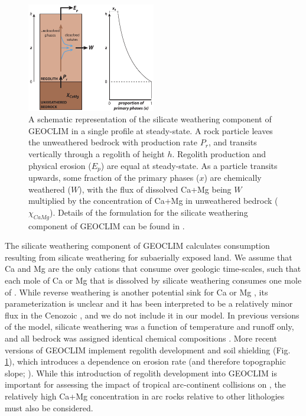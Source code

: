 \begin{figure}[h!]
\begin{center}
	\includegraphics[width=0.5\textwidth]{figures/SEAIs/regolith-schematic.pdf}
	\caption[Schematic representation of the silicate weathering component of GEOCLIM.]{A schematic representation of the silicate weathering component of GEOCLIM in a single profile at steady-state. A rock particle leaves the unweathered bedrock with production rate $P_{r}$, and transits vertically through a regolith of height $h$. Regolith production and physical erosion ($E_{p}$) are equal at steady-state. As a particle transits upwards, some fraction of the primary phases ($x$) are chemically weathered ($W$), with the flux of dissolved Ca+Mg being $W$ multiplied by the concentration of Ca+Mg in unweathered bedrock ($\chi_{CaMg}$). Details of the formulation for the silicate weathering component of GEOCLIM can be found in \MM.}
	\label{fig:regolith-schematic}
\end{center}
\end{figure}

The silicate weathering component of GEOCLIM calculates \COtwo consumption resulting from silicate weathering for subaerially exposed land. We assume that Ca and Mg are the only cations that consume \COtwo over geologic time-scales, such that each mole of Ca or Mg that is dissolved by silicate weathering consumes one mole of \COtwo. While reverse weathering is another potential sink for Ca or Mg \citep{Michalopoulos1995a}, its parameterization is unclear and it has been interpreted to be a relatively minor flux in the Cenozoic \citep{Isson2018a}, and we do not include it in our model. In previous versions of the model, silicate weathering was a function of temperature and runoff only, and all bedrock was assigned identical chemical compositions \citep{Godderis2017c}. More recent versions of GEOCLIM implement regolith development and soil shielding (Fig. \ref{fig:regolith-schematic}), which introduces a dependence on erosion rate (and therefore topographic slope; \citealp{Maffre2018a}). While this introduction of regolith development into GEOCLIM is important for assessing the impact of tropical arc-continent collisions on \pCOtwo, the relatively high Ca+Mg concentration in arc rocks relative to other lithologies must also be considered.

